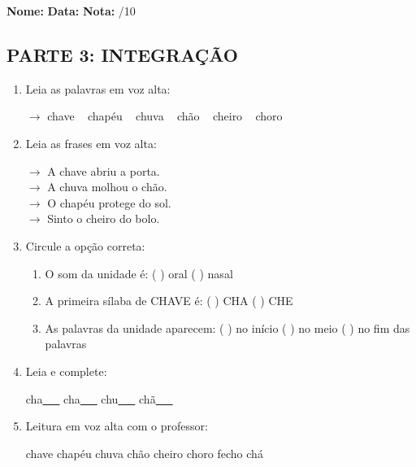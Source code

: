 \begin{exercicio}

\noindent\textbf{Nome:} \underline{\hspace{3.2cm}} \quad \textbf{Data:} \underline{\hspace{1.6cm}} \quad \textbf{Nota:} \underline{\hspace{0.9cm}}/10


\subsection*{PARTE 3: INTEGRAÇÃO}

\begin{enumerate}[resume]

  \item Leia as palavras em voz alta:
  \begin{center}
  $\rightarrow$ chave ~ chapéu ~ chuva ~ chão ~ cheiro ~ choro
  \end{center}

  \item Leia as frases em voz alta:
  \begin{center}
  $\rightarrow$ A chave abriu a porta.\\
  $\rightarrow$ A chuva molhou o chão.\\
  $\rightarrow$ O chapéu protege do sol.\\
  $\rightarrow$ Sinto o cheiro do bolo.\\
  \end{center}

  \item Circule a opção correta:
  \begin{enumerate}[label=(\alph*)]

    \item O som da unidade é: ( ) oral ( ) nasal 

    \item A primeira sílaba de CHAVE é: ( ) CHA ( ) CHE

    \item As palavras da unidade aparecem: ( ) no início ( ) no meio ( ) no fim das palavras

  \end{enumerate}

  \item Leia e complete:
  \begin{center}
  cha\underline{~~~} \quad cha\underline{~~~} \quad chu\underline{~~~} \quad chã\underline{~~~}
  \end{center}

  \item Leitura em voz alta com o professor:
  \begin{center}
  chave \quad chapéu \quad chuva \quad chão \quad cheiro \quad choro \quad fecho \quad chá
  \end{center}

\end{enumerate}

\end{exercicio}

